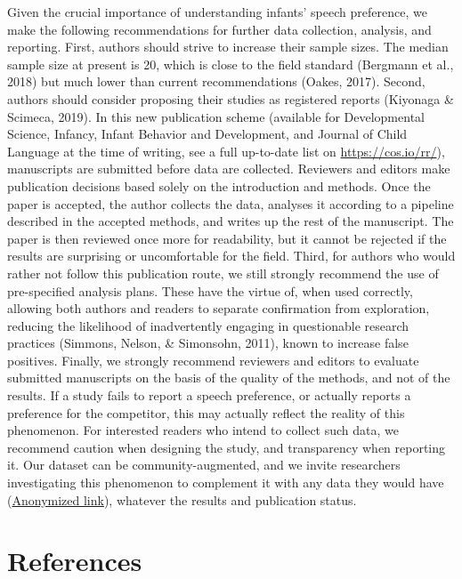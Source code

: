 \documentclass[man]{apa6}
\begin{document}
Given the crucial importance of understanding infants' speech
preference, we make the following recommendations for further data
collection, analysis, and reporting. First, authors should strive to
increase their sample sizes. The median sample size at present is 20,
which is close to the field standard (Bergmann et al., 2018) but much
lower than current recommendations (Oakes, 2017). Second, authors should
consider proposing their studies as registered reports (Kiyonaga \&
Scimeca, 2019). In this new publication scheme (available for
Developmental Science, Infancy, Infant Behavior and Development, and
Journal of Child Language at the time of writing, see a full up-to-date
list on \url{https://cos.io/rr/}), manuscripts are submitted before data
are collected. Reviewers and editors make publication decisions based
solely on the introduction and methods. Once the paper is accepted, the
author collects the data, analyses it according to a pipeline described
in the accepted methods, and writes up the rest of the manuscript. The
paper is then reviewed once more for readability, but it cannot be
rejected if the results are surprising or uncomfortable for the field.
Third, for authors who would rather not follow this publication route,
we still strongly recommend the use of pre-specified analysis plans.
These have the virtue of, when used correctly, allowing both authors and
readers to separate confirmation from exploration, reducing the
likelihood of inadvertently engaging in questionable research practices
(Simmons, Nelson, \& Simonsohn, 2011), known to increase false
positives. Finally, we strongly recommend reviewers and editors to
evaluate submitted manuscripts on the basis of the quality of the
methods, and not of the results. If a study fails to report a speech
preference, or actually reports a preference for the competitor, this
may actually reflect the reality of this phenomenon. For interested
readers who intend to collect such data, we recommend caution when
designing the study, and transparency when reporting it. Our dataset can
be community-augmented, and we invite researchers investigating this
phenomenon to complement it with any data they would have
(\href{https://osf.io/4stz9/?view_only=d0696591ebf34bfc8430f848cd945ca8}{Anonymized
link}), whatever the results and publication status.

\newpage

\section{References}\label{references}
\end{document}
